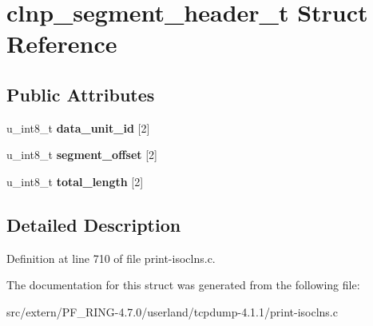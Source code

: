 \hypertarget{structclnp__segment__header__t}{
\section{clnp\_\-segment\_\-header\_\-t Struct Reference}
\label{structclnp__segment__header__t}
}
\subsection*{Public Attributes}
\begin{DoxyCompactItemize}
\item 
\hypertarget{structclnp__segment__header__t_aa1de2826ad5543c351e78f13020bc899}{
u\_\-int8\_\-t {\bfseries data\_\-unit\_\-id} \mbox{[}2\mbox{]}}
\label{structclnp__segment__header__t_aa1de2826ad5543c351e78f13020bc899}

\item 
\hypertarget{structclnp__segment__header__t_a3a0b7220f78d3c4d8b23f474257a75c1}{
u\_\-int8\_\-t {\bfseries segment\_\-offset} \mbox{[}2\mbox{]}}
\label{structclnp__segment__header__t_a3a0b7220f78d3c4d8b23f474257a75c1}

\item 
\hypertarget{structclnp__segment__header__t_a52f160bbf58ad49efa50ba70cded9155}{
u\_\-int8\_\-t {\bfseries total\_\-length} \mbox{[}2\mbox{]}}
\label{structclnp__segment__header__t_a52f160bbf58ad49efa50ba70cded9155}

\end{DoxyCompactItemize}


\subsection{Detailed Description}


Definition at line 710 of file print-\/isoclns.c.



The documentation for this struct was generated from the following file:\begin{DoxyCompactItemize}
\item 
src/extern/PF\_\-RING-\/4.7.0/userland/tcpdump-\/4.1.1/print-\/isoclns.c\end{DoxyCompactItemize}
